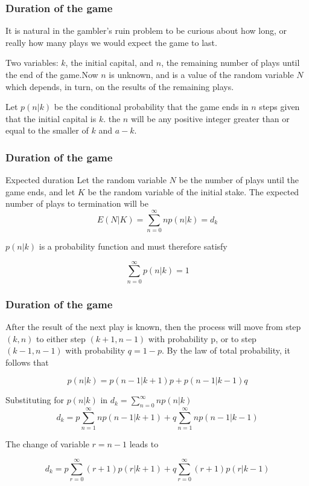 \documentclass[spanish]{beamer}
\begin{document}
\begin{frame}
\frametitle{Duration of the game}
It is natural in the gambler’s ruin problem to be curious about how long, or really
how many plays we would expect the game to last.\vspace{1em}


Two variables: $k$, the initial capital, and $n$, the remaining number of plays until the end of the game.Now $n$ is unknown, and is a value of the random variable $N$ which depends, in turn, on the results of the remaining plays.\vspace{1em}


Let $p(n\vert k)$ be the conditional probability that the game ends in $n$ steps given that the initial capital is $k$. the $n$ will be any positive integer greater than or equal to the smaller of $k$ and $a - k$.
\end{frame}
\begin{frame}
\frametitle{Duration of the game}
\begin{block}{Expected duration}
Let the random variable $N$ be the number of plays until the game ends, and let $K$ be the random variable of the initial stake. The expected number of plays to termination will be 
\begin{equation*}
E(N\vert K)= \sum_{n=0}^{\infty}{np(n\vert k)}=d_{k}
\end{equation*}
\end{block}
$p(n\vert k)$ is a probability function and must therefore satisfy

\begin{equation*}
\sum_{n=0}^{\infty}{p(n\vert k)}=1
\end{equation*}
\end{frame}
\begin{frame}
\frametitle{Duration of the game}

After the result of the next play is known, then the process will move from step $(k, n)$ to either step $(k + 1, n - 1)$ with probability p, or to step $(k - 1, n - 1)$ with probability $q = 1-p$. By the law of total probability, it follows
that

\begin{equation*}
p(n\vert k) = p(n -1\vert k + 1)p + p(n -1\vert k -1)q
\end{equation*}

Substituting for $p(n\vert k)$ in $d_{k}= \sum_{n=0}^{\infty}{np(n\vert k)}$
\begin{equation*}
d_{k} = p \sum_{n=1}^{\infty} np(n-1 \vert k+1)+ q \sum_{n=1}^{\infty}np(n -1\vert k -1)
\end{equation*}

The change of variable $r = n - 1$ leads to

\begin{equation*}
d_{k} = p \sum_{r=0}^{\infty} (r+1)p(r \vert k+1)+ q \sum_{r=0}^{\infty}(r+1)p(r\vert k -1)
\end{equation*}
\end{frame}
\end{document}
